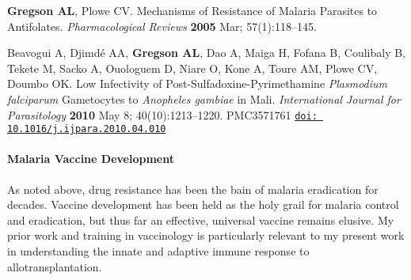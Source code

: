 \documentclass[11pt]{nih-blank}%
\numberwithin{equation}{subsection}
\numberwithin{figure}{subsection}
\numberwithin{table}{subsection}
\begin{document}
\vspace{-10mm}
\renewcommand{\refname}{\normalsize{}\label{gregsonbs}}
\begin{thebibliography}{3}

 \bibitem[1]{} \textbf{Gregson AL}, Plowe CV. Mechanisms of Resistance of Malaria Parasites to Antifolates. \textit{Pharmacological Reviews} \textbf{2005} Mar; 57(1):118--145.

 \bibitem[2]{} Beavogui A, Djimd\'{e} AA, \textbf{Gregson AL}, Dao A, Maiga H, Fofana B, Coulibaly B, Tekete M, Sacko A, Ouologuem D, Niare O, Kone A, Toure AM, Plowe CV, Doumbo OK. Low Infectivity of Post-Sulfadoxine-Pyrimethamine \textit{Plasmodium falciparum} Gametocytes to \textit{Anopheles gambiae} in Mali. \textit{International Journal for Parasitology} \textbf{2010} May 8; 40(10):1213--1220. PMC3571761 \href{http://dx.doi.org/10.1016/j.ijpara.2010.04.010}{\nolinkurl{doi: 10.1016/j.ijpara.2010.04.010}}

\end{thebibliography}

\paragraph{Malaria Vaccine Development}
As noted above, drug resistance has been the bain of malaria eradication for decades. 
Vaccine development has been held as the holy grail for malaria control and eradication, but thus far an effective, universal vaccine remains elusive. 
My prior work and training in vaccinology is particularly relevant to my present work in understanding the innate and adaptive immune response to allotransplantation. 
\end{document}
